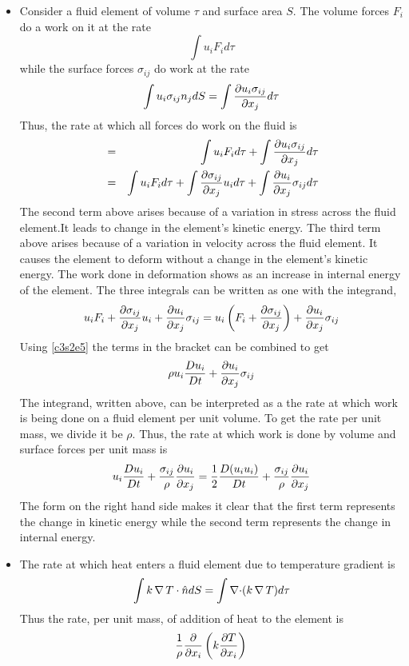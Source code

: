 \begin{itemize}
\item Consider a fluid element of volume $\tau$ and surface area $S$. The volume forces $F_i$ do a work on it at the rate
\[
\int u_i F_i d\tau
\]
while the surface forces $\sigma_{ij}$ do work at the rate
\[
\int u_i\sigma_{ij}n_j dS = \int\frac{\partial{u_i\sigma_{ij}}}{\partial{x_j}} d\tau 
\]
Thus, the rate at which all forces do work on the fluid is
\begin{eqnarray*}
 &=& \int u_i F_i d\tau + \int\frac{\partial{u_i\sigma_{ij}}}{\partial{x_j}} d\tau \\
 &=& \int u_i F_i d\tau + \int\frac{\partial{\sigma_{ij}}}{\partial{x_j}}u_i d\tau + \int\frac{\partial{u_i}}{\partial{x_j}}\sigma_{ij}d\tau
\end{eqnarray*}
The second term above arises because of a variation in stress across the fluid element.It leads to change in the element's kinetic energy. The third term above arises because of a 
variation in velocity across the fluid element. It causes the element to deform without a change in the element's kinetic energy. The work done in deformation shows as an increase in 
internal energy of the element. The three integrals can be written as one with the integrand,
\[
u_iF_i + \frac{\partial{\sigma_{ij}}}{\partial{x_j}}u_i + \frac{\partial{u_i}}{\partial{x_j}}\sigma_{ij} = u_i\left(F_i + \frac{\partial{\sigma_{ij}}}{\partial{x_j}}\right) + \frac{\partial{u_i}}{\partial{x_j}}\sigma_{ij}
\]
Using \eqref{c3s2e5} the terms in the bracket can be combined to get
\begin{equation}\label{c3s4e1}
\rho u_i\frac{D{u_i}}{Dt} + \frac{\partial{u_i}}{\partial{x_j}}\sigma_{ij}
\end{equation}
The integrand, written above, can be interpreted as a the rate at which work is being done on a fluid element per unit volume. To get the rate per unit mass, we divide it be $\rho$. Thus,
the rate at which work is done by volume and surface forces per unit mass is
\begin{equation}\label{c3s4e2}
u_i\frac{D{u_i}}{Dt} + \frac{\sigma_{ij}}{\rho}\frac{\partial{u_i}}{\partial{x_j}} = \frac{1}{2}\frac{D{(u_iu_i)}}{Dt} + \frac{\sigma_{ij}}{\rho}\frac{\partial{u_i}}{\partial{x_j}}
\end{equation}
The form on the right hand side makes it clear that the first term represents the change in kinetic energy while the second term represents the change in internal energy.

\item The rate at which heat enters a fluid element due to temperature gradient is
\[
\int k\operatorname{\nabla} T\cdot\hat{n} dS = \int\operatorname{\nabla\cdot}(k\operatorname{\nabla} T)d\tau
\]
Thus the rate, per unit mass, of addition of heat to the element is
\begin{equation}\label{c3s4e3}
\frac{1}{\rho}\frac{\partial}{\partial x_i}\left(k\frac{\partial{T}}{\partial{x_i}}\right)
\end{equation}


\end{itemize}
